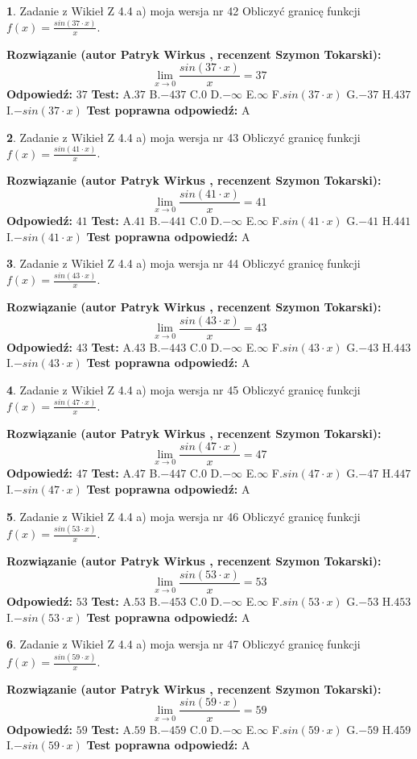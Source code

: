 \documentclass[12pt, a4paper]{article}
\theoremstyle{definition} %
\newtheorem{zad}{}
\newcommand{\zadStart}[1]{\begin{zad}#1\newline}
\newcommand{\zadStop}{\end{zad}}
\newcommand{\rozwStart}[2]{\noindent \textbf{Rozwiązanie (autor #1 , recenzent #2): }\newline}
\newcommand{\rozwStop}{\newline}
\newcommand{\odpStart}{\noindent \textbf{Odpowiedź:}\newline}
\newcommand{\odpStop}{\newline}
\newcommand{\testStart}{\noindent \textbf{Test:}\newline}
\newcommand{\testStop}{\newline}
\newcommand{\kluczStart}{\noindent \textbf{Test poprawna odpowiedź:}\newline}
\newcommand{\kluczStop}{\newline}
\begin{document}
\zadStart{Zadanie z Wikieł Z 4.4 a) moja wersja nr 42}
Obliczyć granicę funkcji $f(x)=\frac{sin(37\cdot x)}{x}$.
\zadStop
\rozwStart{Patryk Wirkus}{Szymon Tokarski}
$$\lim\limits_{x\to 0}\frac{sin(37\cdot x)}{x}=
37$$
\rozwStop
\odpStart
$37$
\odpStop
\testStart
A.$37$
B.$-437$
C.$0$
D.$-\infty$
E.$\infty$
F.$sin(37\cdot x)$
G.$-37$
H.$437$
I.$-sin(37\cdot x)$
\testStop
\kluczStart
A
\kluczStop



\zadStart{Zadanie z Wikieł Z 4.4 a) moja wersja nr 43}
Obliczyć granicę funkcji $f(x)=\frac{sin(41\cdot x)}{x}$.
\zadStop
\rozwStart{Patryk Wirkus}{Szymon Tokarski}
$$\lim\limits_{x\to 0}\frac{sin(41\cdot x)}{x}=
41$$
\rozwStop
\odpStart
$41$
\odpStop
\testStart
A.$41$
B.$-441$
C.$0$
D.$-\infty$
E.$\infty$
F.$sin(41\cdot x)$
G.$-41$
H.$441$
I.$-sin(41\cdot x)$
\testStop
\kluczStart
A
\kluczStop



\zadStart{Zadanie z Wikieł Z 4.4 a) moja wersja nr 44}
Obliczyć granicę funkcji $f(x)=\frac{sin(43\cdot x)}{x}$.
\zadStop
\rozwStart{Patryk Wirkus}{Szymon Tokarski}
$$\lim\limits_{x\to 0}\frac{sin(43\cdot x)}{x}=
43$$
\rozwStop
\odpStart
$43$
\odpStop
\testStart
A.$43$
B.$-443$
C.$0$
D.$-\infty$
E.$\infty$
F.$sin(43\cdot x)$
G.$-43$
H.$443$
I.$-sin(43\cdot x)$
\testStop
\kluczStart
A
\kluczStop



\zadStart{Zadanie z Wikieł Z 4.4 a) moja wersja nr 45}
Obliczyć granicę funkcji $f(x)=\frac{sin(47\cdot x)}{x}$.
\zadStop
\rozwStart{Patryk Wirkus}{Szymon Tokarski}
$$\lim\limits_{x\to 0}\frac{sin(47\cdot x)}{x}=
47$$
\rozwStop
\odpStart
$47$
\odpStop
\testStart
A.$47$
B.$-447$
C.$0$
D.$-\infty$
E.$\infty$
F.$sin(47\cdot x)$
G.$-47$
H.$447$
I.$-sin(47\cdot x)$
\testStop
\kluczStart
A
\kluczStop



\zadStart{Zadanie z Wikieł Z 4.4 a) moja wersja nr 46}
Obliczyć granicę funkcji $f(x)=\frac{sin(53\cdot x)}{x}$.
\zadStop
\rozwStart{Patryk Wirkus}{Szymon Tokarski}
$$\lim\limits_{x\to 0}\frac{sin(53\cdot x)}{x}=
53$$
\rozwStop
\odpStart
$53$
\odpStop
\testStart
A.$53$
B.$-453$
C.$0$
D.$-\infty$
E.$\infty$
F.$sin(53\cdot x)$
G.$-53$
H.$453$
I.$-sin(53\cdot x)$
\testStop
\kluczStart
A
\kluczStop



\zadStart{Zadanie z Wikieł Z 4.4 a) moja wersja nr 47}
Obliczyć granicę funkcji $f(x)=\frac{sin(59\cdot x)}{x}$.
\zadStop
\rozwStart{Patryk Wirkus}{Szymon Tokarski}
$$\lim\limits_{x\to 0}\frac{sin(59\cdot x)}{x}=
59$$
\rozwStop
\odpStart
$59$
\odpStop
\testStart
A.$59$
B.$-459$
C.$0$
D.$-\infty$
E.$\infty$
F.$sin(59\cdot x)$
G.$-59$
H.$459$
I.$-sin(59\cdot x)$
\testStop
\kluczStart
A
\kluczStop
\end{document}
